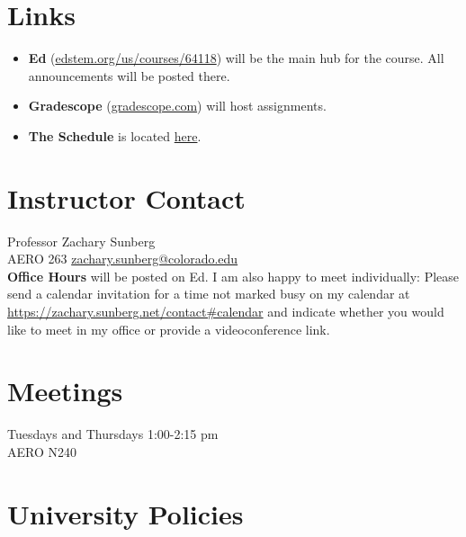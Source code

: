 \documentclass[9pt]{article}
\begin{document}
\section*{Links}

\begin{itemize}[noitemsep]
    \item \textbf{Ed} (\href{https://edstem.org/us/courses/64118}{edstem.org/us/courses/64118}) will be the main hub for the course. All announcements will be posted there.
    \item \textbf{Gradescope} (\url{gradescope.com}) will host assignments.
    \item \textbf{The Schedule} is located \href{https://docs.google.com/spreadsheets/d/1WS52PyQnZtoPaRv4gSBCI2F6-yDppQboChvhXCyA8yU/edit?usp=sharing}{here}.
\end{itemize}

\section*{Instructor Contact}

Professor Zachary Sunberg\\
AERO 263 \href{mailto://zachary.sunberg@colorado.edu}{zachary.sunberg@colorado.edu}\\
\textbf{Office Hours} will be posted on Ed. I am also happy to meet individually: Please send a calendar invitation for a time not marked busy on my calendar at \url{ https://zachary.sunberg.net/contact#calendar} and indicate whether you would like to meet in my office or provide a videoconference link. \\

\section*{Meetings}

Tuesdays and Thursdays 1:00-2:15 pm\\
AERO N240

\section*{University Policies}

\begin{description}

\end{description}
\end{document}
